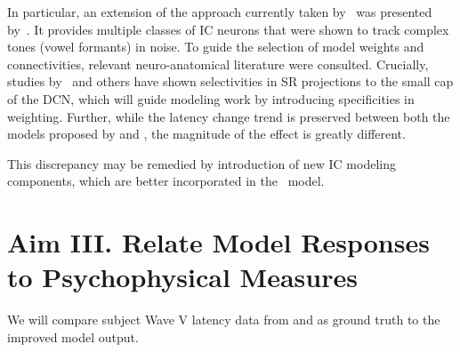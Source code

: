 In particular, an extension of the approach currently taken by~\cite{Verhulst2015Functional} was presented by~\cite{Carney2015Speech}.  It provides multiple classes of IC neurons that were shown to track complex tones (vowel formants) in noise.  To guide the selection of model weights and connectivities, relevant neuro-anatomical literature were consulted.  Crucially, studies by~\cite{Ryugo2008Projections} and others have shown selectivities in SR projections to the small cap of the DCN, which will guide modeling work by introducing specificities in weighting. Further, while the latency change trend is preserved between both the models proposed by \citeauthor{Zilany2014Updated} and \citeauthor{Verhulst2015Functional}, the magnitude of the effect is greatly different.  

This discrepancy may be remedied by introduction of new IC modeling components, which are better incorporated in the~\cite{Zilany2014Updated} model.

\section{Aim III. Relate Model Responses to Psychophysical Measures}  
We will compare subject Wave V latency data from \citeauthor{Mehraei2015Auditory} and \citeauthor{Mehraei2015Individual} as ground truth to the improved model output.